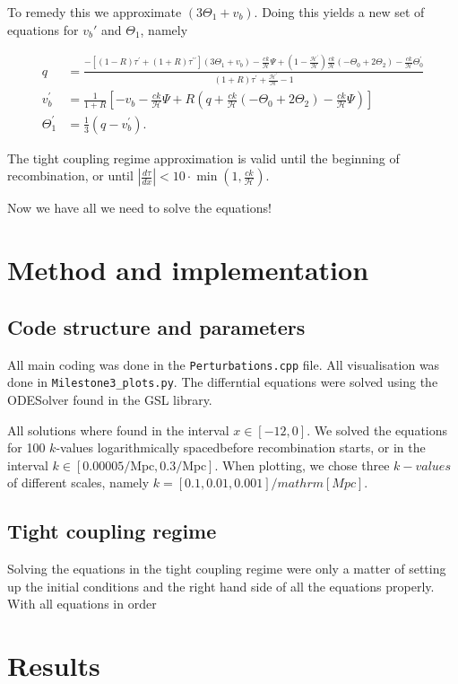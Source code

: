 \documentclass[12pt]{article}
\begin{document}
To remedy this we approximate $(3\Theta_1 + v_b)$. Doing this yields a new set of equations for $v_b'$ and $\Theta_1$, namely 

\begin{equation}\begin{aligned}\label{eq: tight coupling regime dx}
    q &=\frac{-\left[(1-R) \tau^{\prime}+(1+R) \tau^{\prime \prime}\right]\left(3 \Theta_{1}+v_{b}\right)-\frac{c k}{\mathcal{H}} \Psi+\left(1-\frac{\mathcal{H}^{\prime}}{\mathcal{H}}\right) \frac{c k}{\mathcal{H}}\left(-\Theta_{0}+2 \Theta_{2}\right)-\frac{c k}{\mathcal{H}} \Theta_{0}^{\prime}}{(1+R) \tau^{\prime}+\frac{\mathcal{H}^{\prime}}{\mathcal{H}}-1} \\
    v_{b}^{\prime} &=\frac{1}{1+R}\left[-v_{b}-\frac{c k}{\mathcal{H}} \Psi+R\left(q+\frac{c k}{\mathcal{H}}\left(-\Theta_{0}+2 \Theta_{2}\right)-\frac{c k}{\mathcal{H}} \Psi\right)\right] \\
    \Theta_{1}^{\prime} &=\frac{1}{3}\left(q-v_{b}^{\prime}\right).
\end{aligned}\end{equation}

The tight coupling regime approximation is valid until the beginning of recombination, or until $\left|\frac{d \tau}{d x}\right|<10 \cdot \min \left(1, \frac{c k}{\mathcal{H}}\right)$.

Now we have all we need to solve the equations!

\section{Method and implementation}
\subsection{Code structure and parameters}
All main coding was done in the \texttt{Perturbations.cpp} file. All visualisation was done in \texttt{Milestone3\_plots.py}. The differntial equations were solved using the ODESolver found in the GSL library.

All solutions where found in the interval $x\in[-12,0]$. We solved the equations for 100 $k$-values logarithmically spacedbefore recombination starts, or  in the interval $k\in[0.00005/\mathrm{Mpc}, 0.3/\mathrm{Mpc}]$. When plotting, we chose three $k-values$ of different scales, namely $k=[0.1,0.01,0.001]/mathrm[Mpc]$.

\subsection{Tight coupling regime}
Solving the equations in the tight coupling regime were only a matter of setting up the initial conditions and the right hand side of all the equations properly. With all equations in order 

\section{Results}

{}

\end{document}
